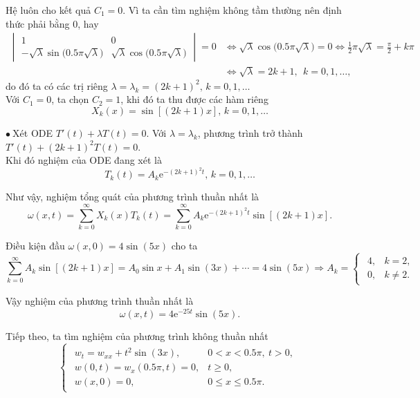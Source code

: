 \documentclass[10pt, a4paper]{article}
\begin{document}
	Hệ luôn cho kết quả $C_1=0$. Vì ta cần tìm nghiệm không tầm thường nên định thức phải bằng 0, hay \begin{align*}
		\begin{vmatrix}
			1&0\\
			-\sqrt\lambda\sin\big(0.5\pi\sqrt\lambda\big)&\sqrt\lambda\cos\big(0.5\pi\sqrt\lambda\big)
		\end{vmatrix}=0&\iff\sqrt\lambda\cos\big(0.5\pi\sqrt\lambda\big)=0\iff\frac12\pi\sqrt\lambda=\frac\pi2+k\pi\\
		&\iff\sqrt\lambda=2k+1,~~k=0,1,\ldots,
	\end{align*}
	do đó ta có các trị riêng $\lambda=\lambda_k=(2k+1)^2,\,k=0,1,\ldots$\\
	
	Với $C_1=0$, ta chọn $C_2=1$, khi đó ta thu được các hàm riêng $$X_k(x)=\sin[(2k+1)x],\,k=0,1,\ldots$$
	
	$\bullet~$Xét ODE $T'(t)+\lambda T(t)=0$. Với $\lambda=\lambda_k$, phương trình trở thành $T'(t)+(2k+1)^2T(t)=0$.\\
	
	Khi đó nghiệm của ODE đang xét là $$T_k(t)=A_k\mathrm e^{-(2k+1)^2t},\,k=0,1,\ldots$$
	
	Như vậy, nghiệm tổng quát của phương trình thuần nhất là $$\omega(x,t)=\sum_{k=0}^\infty X_k(x)T_k(t)=\sum_{k=0}^\infty A_k\mathrm e^{-(2k+1)^2t}\sin[(2k+1)x].$$
	
	Điều kiện đầu $\omega(x,0)=4\sin(5x)$ cho ta $$\sum_{k=0}^\infty A_k\sin[(2k+1)x]=A_0\sin x+A_1\sin(3x)+\cdots=4\sin(5x)\Rightarrow A_k=\begin{cases}
		\begin{array}{ll}
			4, & k=2, \\
			0, & k\ne2.
		\end{array}
	\end{cases}$$
	
	Vậy nghiệm của phương trình thuần nhất là $$\omega(x,t)=4\mathrm e^{-25t}\sin(5x).$$
	
	Tiếp theo, ta tìm nghiệm của phương trình không thuần nhất $$\begin{cases}
		\begin{array}{ll}
			w_t=w_{xx}+t^2\sin(3x), & 0<x<0.5\pi,~t>0,\\
			w(0,t)=w_x(0.5\pi,t)=0, & t\ge0,\\
			w(x,0)=0, & 0\le x\le 0.5\pi.
		\end{array}
	\end{cases}$$
	
\end{document}
